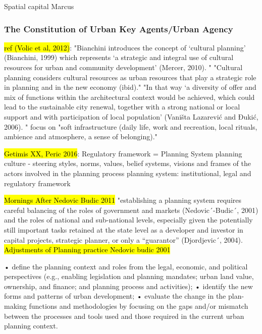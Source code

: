 \documentclass[11pt]{report}
\begin{document}
Spatial capital Marcus

\subsubsection{The Constitution of Urban Key Agents/Urban Agency}

\hl{ref (Volic et al, 2012)}:
"Bianchini introduces the concept of ‘cultural planning’ (Bianchini, 1999) which represents ‘a strategic and integral use of cultural  resources  for  urban  and  community development’ (Mercer, 2010). "
"Cultural  planning considers cultural resources as urban resources that play a strategic role in planning and in the
new economy (ibid)."
"In that way ‘a diversity of offer and mix of functions within the architectural context would be achieved, which could  lead  to  the  sustainable  city  renewal, together with a strong national or local support and  with  participation  of  local  population’ (Vaništa Lazarević and Đukić, 2006). "
focus on "soft infrastructure (daily  life, work and recreation, local rituals, ambience and atmosphere, a sense of belonging)."

\hl{Getimis XX, Peric 2016}:
Regulatory framework = Planning System
planning culture -  steering styles, norms, values, belief systems, visions and frames of the actors involved in the planning process
planning system: institutional, legal and regulatory framework

\hl{Mornings After Nedovic Budic 2011}
"establishing a planning system requires careful balancing of the roles of government and markets (Nedovic´-Budic´, 2001) and the roles of national and sub-national levels, especially given the potentially still important tasks retained at the state level as a developer and investor in capital projects, strategic planner, or only a “guarantor” (Djordjevic´, 2004).
\hl{Adjustments of Planning practice Nedovic budic 2001}

• deﬁne the planning context and roles from the legal, economic, and political perspectives (e.g., enabling legislation and planning mandates;
urban land value, ownership, and ﬁnance; and
planning process and activities);
• identify the new forms and patterns of urban development;
• evaluate the change in the plan-making functions and methodologies by focusing on the gaps and/or mismatch between the processes and tools used
and those required in the current urban planning context.
\end{document}
